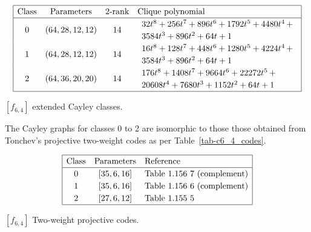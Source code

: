 \begin{table}[!bhpt] %
%
\small{}
\begin{align*}
\def\arraystretch{1.2}
\begin{array}{|cccl|}
\hline
\text{Class} &
\text{Parameters} &
\text{2-rank} &
\text{Clique polynomial}
\\
\hline
0 &
(64, 28, 12, 12) &
14 &
\begin{array}{l}
32t^{8} + 256t^{7} + 896t^{6} + 1792t^{5} + 4480t^{4}
\,+
\\
 3584t^{3} + 896t^{2} + 64t + 1
\end{array}
\\
1 &
(64, 28, 12, 12) &
14 &
\begin{array}{l}
16t^{8} + 128t^{7} + 448t^{6} + 1280t^{5} + 4224t^{4}
\,+
\\
 3584t^{3} + 896t^{2} + 64t + 1
\end{array}
\\
2 &
(64, 36, 20, 20) &
14 &
\begin{array}{l}
176t^{8} + 1408t^{7} + 9664t^{6} + 22272t^{5}
\,+
\\
 20608t^{4} + 7680t^{3} + 1152t^{2} + 64t + 1
\end{array}
\\
\hline
\end{array}
\end{align*}
\caption{$[f_{6,4}]$ extended Cayley classes.}
\label{tab-c6_4_EC_classes}
\end{table}

The Cayley graphs for classes 0 to 2 are isomorphic to those those obtained from
Tonchev's projective two-weight codes \cite{Ton07codes} as per Table~\ref{tab-c6_4_codes}.

\begin{table}[!bhpt] %
\small{
\begin{align*}
\def\arraystretch{1.2}
\begin{array}{|ccl|}
\hline
\text{Class} &
\text{Parameters} & \text{Reference}
\\
\hline
0 & [35,6,16] & \text{Table 1.156 7 (complement)}
\\
1 & [35,6,16] & \text{Table 1.156 6 (complement)}
\\
2 & [27,6,12] & \text{Table 1.155 5 }
\\
\hline
\end{array}
\end{align*}
}
\caption{$[f_{6,4}]$ Two-weight projective codes.}
\label{tab-c6_4_codes}
\end{table}

